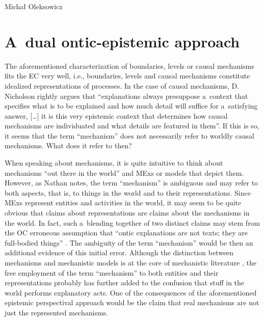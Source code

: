 \begin{artengenv}{Michał Oleksowicz}
\section{A~dual ontic-epistemic approach }
The aforementioned characterization of boundaries, levels or causal mechanisms fits the EC very well, i.e., boundaries, levels and causal mechanisms constitute idealized representations of processes. In the case of causal mechanisms, D. Nicholson
\parencite*[][p.160]{nicholson_concept_2012} %
 rightly argues that ``explanations always presuppose a~context that specifies what is to be explained and how much detail will suffice for a~satisfying answer, […] it is this very epistemic context that determines how causal mechanisms are individuated and what details are featured in them''. If this is so, it seems that the term ``mechanism'' does not necessarily refer to worldly causal mechanisms. What does it refer to then?

When speaking about mechanisms, it is quite intuitive to think about mechanisms ``out there in the world'' and MExs or models that depict them. However, as Nathan
\parencite[][pp.171–172]{nathan_black_2021} %
 notes, the term ``mechanism'' is ambiguous and may refer to both aspects, that is, to things in the world and to their representations. Since MExs represent entities and activities in the world, it may seem to be quite obvious that claims about representations are claims about the mechanisms in the world. In fact, such a~blending together of two distinct claims may stem from the OC erroneous assumption that ``ontic explanations are not texts; they are full-bodied things'' 
\parencite[][p.40]{kaiser_ontic_2014}. %
 The ambiguity of the term ``mechanism'' would be then an additional evidence of this initial error. Although the distinction between mechanisms and mechanistic models is at the core of mechanistic literature 
\parencite[][]{glennan_modeling_2005}, %
 the free employment of the term ``mechanism'' to both entities and their representations probably has further added to the confusion that stuff in the world performs explanatory acts. One of the consequences of the aforementioned epistemic perspectival approach would be the claim that real mechanisms are not just the represented mechanisms.


\end{artengenv}

